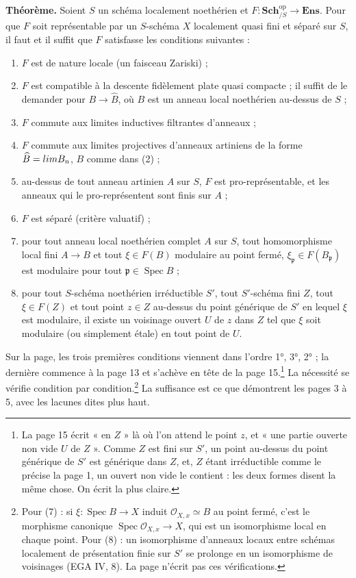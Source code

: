 \documentclass[11pt,a4paper]{article}
\begin{document}
\textbf{Théorème.} Soient $S$ un schéma localement noethérien et $F :
\mathbf{Sch}_{/S}^{\mathrm{op}} \to \mathbf{Ens}$. Pour que $F$ soit
représentable par un $S$-schéma $X$ localement quasi fini et séparé sur $S$,
il faut et il suffit que $F$ satisfasse les conditions suivantes :
\begin{enumerate}
\item[(1)] $F$ est de nature locale (un faisceau Zariski) ;
\item[(2)] $F$ est compatible à la descente fidèlement plate quasi compacte ;
il suffit de le demander pour $B \to \widehat{B}$, où $B$ est un anneau local
noethérien au-dessus de $S$ ;
\item[(3)] $F$ commute aux limites inductives filtrantes d'anneaux ;
\item[(4)] $F$ commute aux limites projectives d'anneaux artiniens de la forme
$\widehat{B} = \varprojlim B_n$, $B$ comme dans (2) ;
\item[(5)] au-dessus de tout anneau artinien $A$ sur $S$, $F$ est
pro-représentable, et les anneaux qui le pro-représentent sont finis sur $A$ ;
\item[(6)] $F$ est séparé (critère valuatif) ;
\item[(7)] pour tout anneau local noethérien complet $A$ sur $S$, tout
homomorphisme local fini $A \to B$ et tout $\xi \in F(B)$ modulaire au point
fermé, $\xi_{\mathfrak{p}} \in F(B_{\mathfrak{p}})$ est modulaire pour tout
$\mathfrak{p} \in \operatorname{Spec} B$ ;
\item[(8)] pour tout $S$-schéma noethérien irréductible $S'$, tout
$S'$-schéma fini $Z$, tout $\xi \in F(Z)$ et tout point $z \in Z$ au-dessus du
point générique de $S'$ en lequel $\xi$ est modulaire, il existe un voisinage
ouvert $U$ de $z$ dans $Z$ tel que $\xi$ soit modulaire (ou simplement étale)
en tout point de $U$.
\end{enumerate}

Sur la page, les trois premières conditions viennent dans l'ordre 1°, 3°,
2° ; la dernière commence à la page 13 et s'achève en tête de la page
15.\footnote{La page 15 écrit « en $Z$ » là où l'on attend le point $z$, et
« une partie ouverte non vide $U$ de $Z$ ». Comme $Z$ est fini sur $S'$, un
point au-dessus du point générique de $S'$ est générique dans $Z$, et, $Z$
étant irréductible comme le précise la page 1, un ouvert non vide le
contient : les deux formes disent la même chose. On écrit la plus claire.}
La nécessité se vérifie condition par condition.\footnote{Pour (7) : si
$\xi : \operatorname{Spec} B \to X$ induit $\mathcal{O}_{X,x} \simeq B$ au
point fermé, c'est le morphisme canonique $\operatorname{Spec}
\mathcal{O}_{X,x} \to X$, qui est un isomorphisme local en chaque point. Pour
(8) : un isomorphisme d'anneaux locaux entre schémas localement de
présentation finie sur $S'$ se prolonge en un isomorphisme de voisinages
(EGA IV, 8). La page n'écrit pas ces vérifications.} La suffisance est ce que
démontrent les pages 3 à 5, avec les lacunes dites plus haut.
\end{document}
